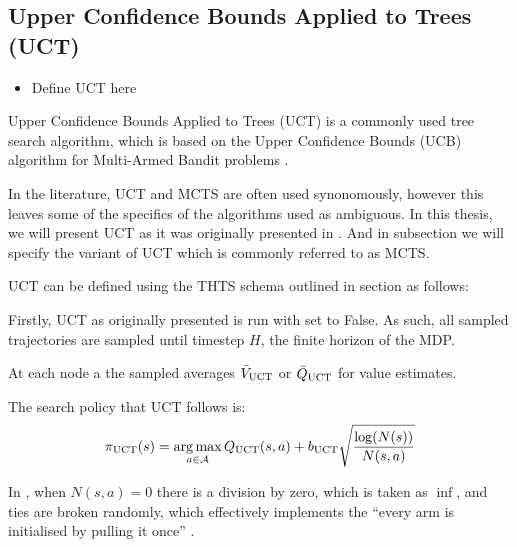     

    
    \subsection{Upper Confidence Bounds Applied to Trees (UCT)}
    \label{sec:2-3-2-uct}
    
        \begin{itemize}
            \item Define UCT here
        \end{itemize}



        Upper Confidence Bounds Applied to Trees (UCT)  is a commonly used tree search algorithm, which is based on the Upper Confidence Bounds (UCB)  algorithm for Multi-Armed Bandit problems .

        In the literature, UCT and MCTS are often used synonomously, however this leaves some of the specifics of the algorithms used as ambiguous. In this thesis, we will present UCT as it was originally presented in . And in subsection  we will specify the variant of UCT which is commonly referred to as MCTS.

        UCT can be defined using the THTS schema outlined in section  as follows:

        Firstly, UCT as originally presented is run with \mctsmode set to False. As such, all sampled trajectories are sampled until timestep $H$, the finite horizon of the MDP. 

        At each node a the sampled averages $\bar{V}_{{\textnormal{UCT}}}$ or $\bar{Q}_{{\textnormal{UCT}}}$ for value estimates.

        The search policy that UCT follows is:
        \begin{align}
            \pi_{{\textnormal{UCT}}}(s) = \operatorname*{arg\,max}_{a\in\mathcal{A}} Q_{{\textnormal{UCT}}}(s,a) + b_{{\textnormal{UCT}}} \sqrt{\frac{\log(N(s))}{N(s,a)}} 
        \end{align}

        In , when $N(s,a)=0$ there is a division by zero, which is taken as $\inf$, and ties are broken randomly, which effectively implements the ``every arm is initialised by pulling it once'' . 

